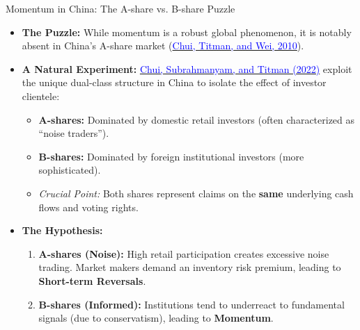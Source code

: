 \documentclass{beamer}
\begin{document}
\begin{frame}{Momentum in China: The A-share vs. B-share Puzzle}
	\begin{itemize}
		\item \textbf{The Puzzle:} While momentum is a robust global phenomenon, it is notably absent in China's A-share market (\href{https://doi.org/10.1111/j.1540-6261.2009.01532.x}{\textcolor{blue}{Chui, Titman, and Wei, 2010}}).
		\item \textbf{A Natural Experiment:} \href{https://doi.org/10.1093/rof/rfac010}{\textcolor{blue}{Chui, Subrahmanyam, and Titman (2022)}} exploit the unique dual-class structure in China to isolate the effect of investor clientele:
		\begin{itemize}
			\item \textbf{A-shares:} Dominated by domestic retail investors (often characterized as ``noise traders'').
			\item \textbf{B-shares:} Dominated by foreign institutional investors (more sophisticated).
			\item \textit{Crucial Point:} Both shares represent claims on the \textbf{same} underlying cash flows and voting rights.
		\end{itemize}
		\item \textbf{The Hypothesis:}
		\begin{enumerate}
			\item \textbf{A-shares (Noise):} High retail participation creates excessive noise trading. Market makers demand an inventory risk premium, leading to \textbf{Short-term Reversals}.
			\item \textbf{B-shares (Informed):} Institutions tend to underreact to fundamental signals (due to conservatism), leading to \textbf{Momentum}.
		\end{enumerate}
	\end{itemize}
\end{frame}
\end{document}
